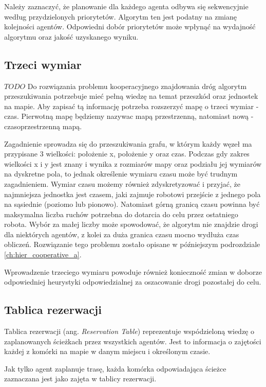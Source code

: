 Należy zaznaczyć, że planowanie dla każdego agenta odbywa się sekwencyjnie według przydzielonych priorytetów.
Algorytm ten jest podatny na zmianę kolejności agentów. Odpowiedni dobór priorytetów może wpłynąć na wydajność algorytmu oraz jakość uzyskanego wyniku.

\subsection{Trzeci wymiar}
$TODO$
Do rozwiązania problemu kooperacyjnego znajdowania dróg algorytm przeszukiwania potrzebuje mieć pełną wiedzę na temat przeszkód oraz jednostek na mapie.
Aby zapisać tą informację potrzeba rozszerzyć mapę o trzeci wymiar - czas. 
Pierwotną mapę będziemy nazywac mapą przestrzenną, natomiast nową - czasoprzestrzenną mapą. \cite{cooppath}

Zagadnienie sprowadza się do przeszukiwania grafu, w którym każdy węzeł ma przypisane 3 wielkości: położenie x, położenie y oraz czas.
Podczas gdy zakres wielkości x i y jest znany i wynika z rozmiarów mapy oraz podziału jej wymiarów na dyskretne pola, to jednak określenie wymiaru czasu może być trudnym zagadnieniem.
Wymiar czasu możemy również zdyskretyzować i przyjać, że najmniejsza jednostka jest czasem, jaki zajmuje robotowi przejście z jednego pola na sąsiednie (poziomo lub pionowo). Natomiast górną granicą czasu powinna być maksymalna liczba ruchów potrzebna do dotarcia do celu przez ostatniego robota. Wybór za małej liczby może spowodować, że algorytm nie znajdzie drogi dla niektórych agentów, z kolei za duża granica czasu mocno wydłuża czas obliczeń. Rozwiązanie tego problemu zostało opisane w późniejszym podrozdziale \ref{ch:hier_cooperative_a}.

Wprowadzenie trzeciego wymiaru powoduje również konieczność zmian w doborze odpowiedniej heurystyki odpowiedzialnej za oszacowanie drogi pozostałej do celu.

\subsection{Tablica rezerwacji}
Tablica rezerwacji (ang. {\it Reservation Table}) reprezentuje wspódzieloną wiedzę o zaplanowanych ścieżkach przez wszystkich agentów.
Jest to informacja o zajętości każdej z komórki na mapie w danym miejscu i określonym czasie.

Jak tylko agent zaplanuje trasę, każda komórka odpowiadająca ścieżce zaznaczana jest jako zajęta w tablicy rezerwacji.

